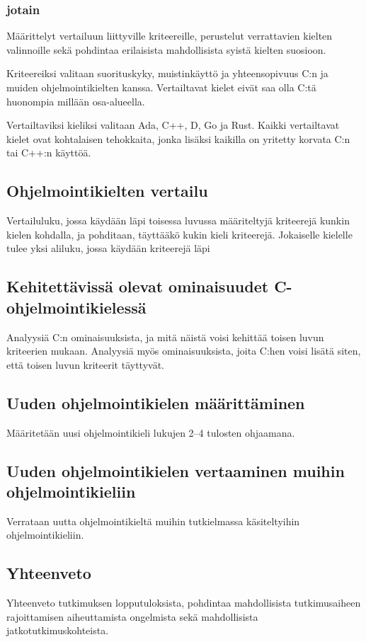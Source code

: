 \subsubsection{jotain}

Määrittelyt vertailuun liittyville kriteereille, perustelut verrattavien
kielten valinnoille sekä pohdintaa erilaisista mahdollisista syistä kielten
suosioon.

Kriteereiksi valitaan suorituskyky, muistinkäyttö ja yhteensopivuus C:n ja
muiden ohjelmointikielten kanssa. Vertailtavat kielet eivät saa olla C:tä
huonompia millään osa-alueella.

Vertailtaviksi kieliksi valitaan Ada, C++, D, Go ja Rust. Kaikki vertailtavat
kielet ovat kohtalaisen tehokkaita, jonka lisäksi kaikilla on yritetty korvata
C:n tai C++:n käyttöä.

\subsection{Ohjelmointikielten vertailu}

Vertailuluku, jossa käydään läpi toisessa luvussa määriteltyjä kriteerejä
kunkin kielen kohdalla, ja pohditaan, täyttääkö kukin kieli kriteerejä.
Jokaiselle kielelle tulee yksi aliluku, jossa käydään kriteerejä läpi

\subsection{Kehitettävissä olevat ominaisuudet C-ohjelmointikielessä}

Analyysiä C:n ominaisuuksista, ja mitä näistä voisi kehittää toisen luvun
kriteerien mukaan. Analyysiä myös ominaisuuksista, joita C:hen voisi lisätä
siten, että toisen luvun kriteerit täyttyvät.

\subsection{Uuden ohjelmointikielen määrittäminen}

Määritetään uusi ohjelmointikieli lukujen 2--4 tulosten ohjaamana.

\subsection{Uuden ohjelmointikielen vertaaminen muihin ohjelmointikieliin}

Verrataan uutta ohjelmointikieltä muihin tutkielmassa käsiteltyihin
ohjelmointikieliin.

\subsection{Yhteenveto}

Yhteenveto tutkimuksen lopputuloksista, pohdintaa mahdollisista tutkimusaiheen
rajoittamisen aiheuttamista ongelmista sekä mahdollisista
jatkotutkimuskohteista.
